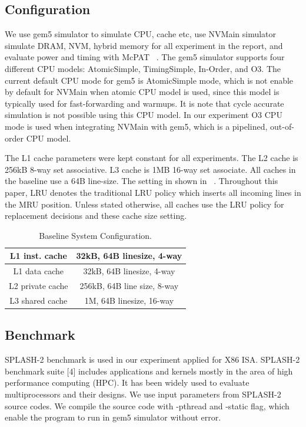 

\subsection{Configuration}

We use gem5 simulator to simulate CPU, cache etc, use NVMain simulator simulate DRAM, NVM, hybrid memory for all experiment in the report, and evaluate power and timing with McPAT ~\cite{mcpat}. The gem5 simulator supports four different CPU models: AtomicSimple, TimingSimple, In-Order, and O3. The current default CPU mode for gem5 is AtomicSimple mode, which is not enable by default for NVMain when atomic CPU model is used, since this model is typically used for fast-forwarding and warmups. It is note that cycle accurate simulation is not possible using this CPU model. In our experiment O3 CPU mode is used when integrating NVMain with gem5, which is a pipelined, out-of-order CPU model.   



                              
The L1 cache parameters were kept constant for all experiments. The L2 cache is 256kB 8-way set associative. L3 cache is 1MB 16-way set associate. All caches in the baseline use a 64B line-size. The setting in shown in ~. Throughout this paper, LRU denotes the traditional LRU policy which inserts all incoming lines in the MRU position. Unless stated otherwise, all caches use the LRU policy for replacement decisions and these cache size setting. 


\begin{table}[ht]
\centering
\caption{\small Baseline System Configuration.}
\begin{tabular}{|c|c|}
\hline 
L1 inst. cache                       & 32kB, 64B linesize, 4-way \\ \hline
L1 data cache                        & 32kB, 64B linesize, 4-way \\ \hline
L2 private cache                     & 256kB, 64B line size, 8-way  \\ \hline
L3 shared cache                      & 1M, 64B linesize, 16-way \\ \hline
\end{tabular}
\label{tbl:cacheset}
\end{table}




\subsection{Benchmark}
SPLASH-2 benchmark is used in our experiment applied for X86 ISA. SPLASH-2 benchmark suite [4] includes applications and kernels mostly in the area of high performance computing (HPC). It has been widely used to evaluate multiprocessors and their designs. We use input parameters from SPLASH-2 source codes.  We compile the source code with -pthread and -static flag, which enable the program to run in gem5 simulator without error. 


